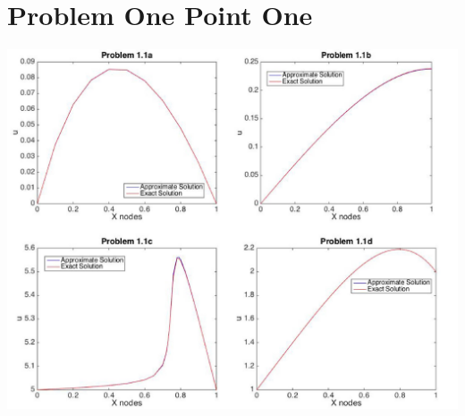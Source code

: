 \documentclass[11pt]{article}
\begin{document}
\section*{Problem One Point One}
\begin{center}
\includegraphics[width=\textwidth, keepaspectratio]{prob1.jpg}
\end{center}
\end{document}
